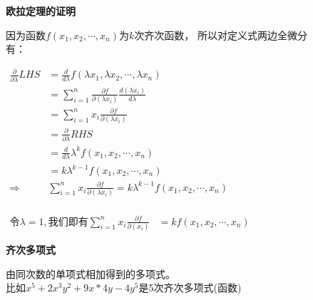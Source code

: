 \documentclass[fontset=windows]{article}
\begin{document}
    \begin{figure}[!htb]
        \begin{minipage}[t]{0.5\linewidth}
            \noindent\textbf{欧拉定理的证明}

            \vspace*{1em}
            因为函数$f(x_1, x_2, \cdots , x_n)$为$k$次齐次函数， 所以对定义式两边全微分有：
       
            \noindent
            $
            \begin{aligned}
               \frac{\partial }{\partial \lambda} LHS 
                   & =\frac{d}{d\lambda}f(\lambda x_1, \lambda x_2, \cdots , \lambda x_n) \\
                   & = \sum_{i=1}^{n}{\frac{\partial f}{\partial (\lambda x_i)}\frac{d (\lambda x_i)}{d \lambda}}\ \\
                   & = \sum_{i=1}^{n}{x_i \frac{\partial f}{\partial (\lambda x_i)}} \\
                   & = \frac{\partial }{\partial \lambda} RHS \\
                   & = \frac{d}{d \lambda} \lambda^k f( x_1,  x_2, \cdots ,  x_n) \\
                   & = k \lambda^{k-1}f( x_1,  x_2, \cdots ,  x_n)\\
                   \Longrightarrow &\sum_{i=1}^{n}{x_i \frac{\partial f}{\partial (\lambda x_i)}}  = k \lambda^{k-1}f( x_1,  x_2, \cdots ,  x_n)\\
            \end{aligned} 
            $
       
            $
            \begin{aligned}
               \text{令} \lambda = 1, \text{我们即有}
               \sum_{i=1}^{n}{x_i \frac{\partial f}{\partial (x_i)}} & = k f( x_1,  x_2, \cdots ,  x_n)
            \end{aligned} 
            $
        
        \end{minipage}
    \vline
        \begin{minipage}[t]{0.5\linewidth}
            \noindent\textbf{齐次多项式}
            
            \vspace*{1em}
            由同次数的单项式相加得到的多项式。\\比如$x^5 + 2x^3y^2 + 9x*4y - 4 y^5$是5次齐次多项式(函数)
        \end{minipage}
    \end{figure}
\end{document}
